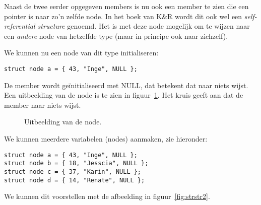 Naast de twee eerder opgegeven members is nu ook een member  te zien die een pointer is naar zo'n zelfde node. In het boek van K\&R wordt dit ook wel een \textsl{self-referential structure} genoemd. Het is met deze node mogelijk om te wijzen naar een \textsl{andere} node van hetzelfde type (maar in principe ook naar zichzelf).

We kunnen nu een node van dit type initialiseren:

\begin{lstlisting}[style=lstoneline]
struct node a = { 43, "Inge", NULL };
\end{lstlisting}

De member  wordt geïnitialiseerd met NULL, dat betekent dat  naar niets wijst. Een uitbeelding van de node is te zien in figuur~\ref{fig:strstr1}. Het kruis geeft aan dat de member  naar niets wijst.

\begin{figure}[!ht]
\centering
{}
\caption{Uitbeelding van de node.}
\label{fig:strstr1}
\end{figure}

We kunnen meerdere variabelen (nodes) aanmaken, zie hieronder:

\begin{lstlisting}[style=lstoneline]
struct node a = { 43, "Inge", NULL };
struct node b = { 18, "Jesscia", NULL };
struct node c = { 37, "Karin", NULL };
struct node d = { 14, "Renate", NULL };
\end{lstlisting}

We kunnen dit voorstellen met de afbeelding in figuur~\ref{fig:strstr2}.


